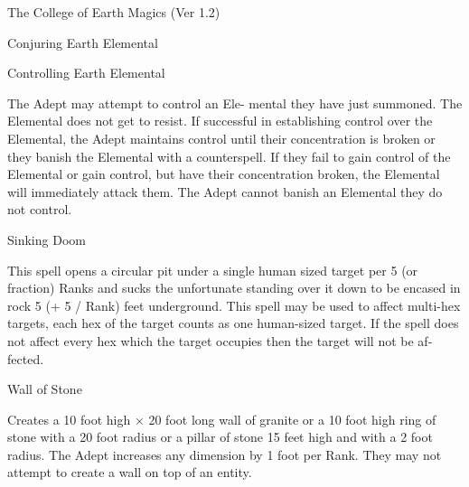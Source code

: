 \begin{Chapter}{The College of Earth Magics (Ver 1.2)}
\begin{spell}[S-10]{Conjuring Earth Elemental }
\begin{effects}
\end{effects}
\end{spell}

\begin{spell}[S-11]{Controlling Earth Elemental }

\begin{effects}
The  Adept may attempt to control an Ele-
mental  they  have  just  summoned.  The  Elemental 
does  not  get  to  resist.  If  successful  in  establishing 
control  over  the  Elemental,  the  Adept  maintains 
control  until  their  concentration  is  broken  or  they 
banish  the  Elemental  with  a  counterspell.  If  they 
fail to gain control of the Elemental or gain control, 
but have their concentration broken, the Elemental 
will  immediately  attack  them.  The  Adept  cannot 
banish an Elemental they do not control. 

\end{effects}
\end{spell}

\begin{spell}[S-12]{Sinking Doom }

\begin{effects}
 This  spell  opens  a  circular  pit  under  a 
single human sized target per 5 (or fraction) Ranks 
and sucks the unfortunate standing over it down to 
be encased in rock 5 (+ 5 / Rank) feet underground. 
This spell may be used to affect multi-hex targets, 
each  hex  of  the  target  counts  as  one  human-sized 
target. If the spell does not affect every hex which 
the  target  occupies  then  the  target  will  not  be  af-
fected. 

\end{effects}
\end{spell}

\begin{spell}[S-13]{Wall of Stone }

\begin{effects}
Creates a 10 foot high × 20 foot long wall 
of granite or a 10 foot high ring of stone with a 20 
foot radius or a pillar of stone 15 feet high and with 
a 2 foot radius. The Adept increases any dimension 
by 1 foot per Rank. They may not attempt to create 
a wall on top of an entity. 


\end{effects}
\end{spell}
\end{Chapter}
